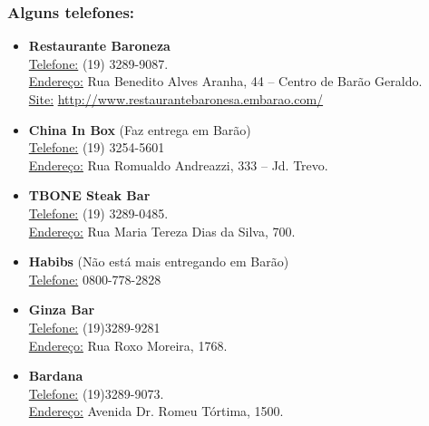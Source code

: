 \subsubsection{Alguns telefones:}

\begin{itemize}
\item  \textbf{Restaurante Baroneza}
\\\underline{Telefone:} (19) 3289-9087.
\\\underline{Endereço:} Rua Benedito Alves Aranha, 44 -- Centro de Barão Geraldo.
\\\underline{Site:} \url{http://www.restaurantebaronesa.embarao.com/}
\end{itemize}

\begin{itemize}
\item  \textbf{China In Box} (Faz entrega em Barão)
\\\underline{Telefone:} (19) 3254-5601
\\\underline{Endereço:} Rua Romualdo Andreazzi, 333 -- Jd. Trevo.
\end{itemize}

\begin{itemize}
\item  \textbf{TBONE Steak Bar}
\\\underline{Telefone:} (19) 3289-0485.
\\\underline{Endereço:} Rua Maria Tereza Dias da Silva, 700.
\end{itemize}

\begin{itemize}
\item  \textbf{Habibs} (Não está mais entregando em Barão)
\\\underline{Telefone:} 0800-778-2828
\end{itemize}

\begin{itemize}
\item  \textbf{Ginza Bar}
\\\underline{Telefone:} (19)3289-9281
\\\underline{Endereço:} Rua Roxo Moreira, 1768.
\end{itemize}

\begin{itemize}
\item  \textbf{Bardana}
\\\underline{Telefone:} (19)3289-9073.
\\\underline{Endereço:} Avenida Dr. Romeu Tórtima, 1500.
\end{itemize}

